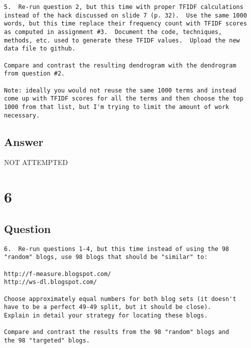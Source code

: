 \documentclass[letterpaper,11pt]{article}
\begin{document}
\begin{verbatim}
5.  Re-run question 2, but this time with proper TFIDF calculations
instead of the hack discussed on slide 7 (p. 32).  Use the same 1000
words, but this time replace their frequency count with TFIDF scores
as computed in assignment #3.  Document the code, techniques,
methods, etc. used to generate these TFIDF values.  Upload the new
data file to github.

Compare and contrast the resulting dendrogram with the dendrogram
from question #2.

Note: ideally you would not reuse the same 1000 terms and instead
come up with TFIDF scores for all the terms and then choose the top
1000 from that list, but I'm trying to limit the amount of work
necessary.
\end{verbatim}

\subsection*{Answer}

\begin{center}
\Huge{NOT ATTEMPTED}
\end{center}


\clearpage


\section*{6}

\subsection*{Question}

\begin{verbatim}
6.  Re-run questions 1-4, but this time instead of using the 98 
"random" blogs, use 98 blogs that should be "similar" to:

http://f-measure.blogspot.com/
http://ws-dl.blogspot.com/

Choose approximately equal numbers for both blog sets (it doesn't
have to be a perfect 49-49 split, but it should be close).  
Explain in detail your strategy for locating these blogs.  

Compare and contrast the results from the 98 "random" blogs and 
the 98 "targeted" blogs. 
\end{verbatim}
\end{document}
